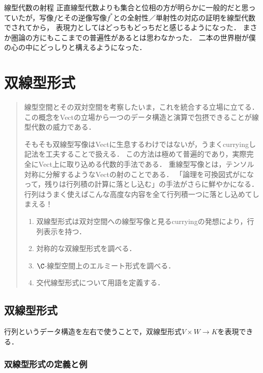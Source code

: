\documentclass[uplatex, dvipdfmx]{jsreport}
\begin{document}
\begin{itembox}[l]{線型代数の射程}
    正直線型代数よりも集合と位相の方が明らかに一般的だと思っていたが，写像$f$とその逆像写像$f^*$との全射性／単射性の対応の証明を線型代数でされてから，
    表現力としてはどっちもどっちだと感じるようになった．
    まさか圏論の方にもここまでの普遍性があるとは思わなかった．
    二本の世界樹が僕の心の中にどっしりと構えるようになった．
\end{itembox}

\chapter{双線型形式}

\begin{quotation}
    線型空間とその双対空間を考察したいま，これを統合する立場に立てる．この概念をVectの立場から一つのデータ構造と演算で包摂できることが線型代数の威力である．
    
    そもそも双線型写像はVectに生息するわけではないが，うまくcurryingし記法を工夫することで扱える．
    この方法は極めて普遍的であり，実際完全にVect上に取り込める代数的手法である．
    重線型写像とは，テンソル対称に分解するようなVectの射のことである．
    「論理を可換図式がになって，残りは行列積の計算に落とし込む」の手法がさらに鮮やかになる．
    行列はうまく使えばこんな高度な内容を全て行列積一つに落とし込めてしまえる！
    \begin{enumerate}
        \item 双線型形式は双対空間への線型写像と見るcurryingの発想により，行列表示を持つ．
        \item 対称的な双線型形式を調べる．
        \item $\C$-線型空間上のエルミート形式を調べる．
        \item 交代線型形式について用語を定義する．
    \end{enumerate}
\end{quotation}

\section{双線型形式}

\begin{tcolorbox}[colframe=ForestGreen, colback=ForestGreen!10!white, breakable]
    行列というデータ構造を左右で使うことで，双線型形式$V\times W\to K$を表現できる．
\end{tcolorbox}

\subsection{双線型形式の定義と例}
\end{document}
